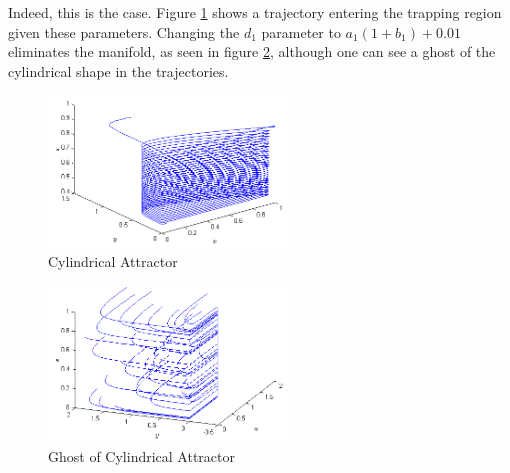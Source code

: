 \documentclass{article}
\begin{document}
Indeed, this is the case. Figure \ref{attractor} shows a trajectory entering the trapping region given these parameters. Changing the $d_1$ parameter to $a_1 ( 1 + b_1) + 0.01$ eliminates the manifold, as seen in figure \ref{noattractor}, although one can see a ghost of the cylindrical shape in the trajectories.

\begin{figure}[h!]
\centering
\includegraphics[width=2.5in]{attractor.png}
\caption{Cylindrical Attractor}
\label{attractor}
\end{figure}

\begin{figure}[h!]
\centering
\includegraphics[width=2.5in]{noattractor.png}
\caption{Ghost of Cylindrical Attractor}
\label{noattractor}
\end{figure}




\nocite{*}
\end{document}
